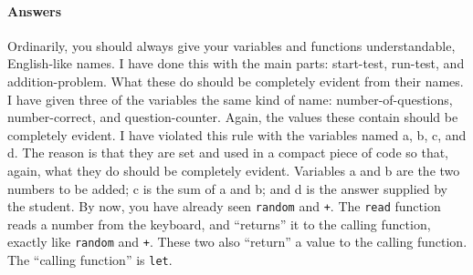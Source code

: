 \documentclass{article}
\begin{document}
\paragraph{Answers}Ordinarily, you should always give your variables and functions understandable, English-like names. I have done this with the main parts: start-test, run-test, and addition-problem. What these do should be completely evident from their names. I have given three of the variables the same kind of name: number-of-questions, number-correct, and question-counter. Again, the values these contain should be completely evident. I have violated this rule with the variables named a, b, c, and d. The reason is that they are set and used in a compact piece of code so that, again, what they do should be completely evident. Variables a and b are the two numbers to be added; c is the sum of a and b; and d is the answer supplied by the student. By now, you have already seen \texttt{random} and \texttt{+}. The \texttt{read} function reads a number from the keyboard, and ``returns'' it to the calling function, exactly like \texttt{random} and \texttt{+}. These two also ``return'' a value to the calling function. The ``calling function'' is \texttt{let}.
\end{document}
